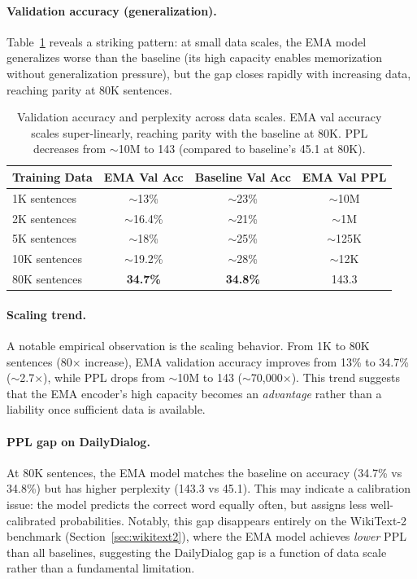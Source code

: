\documentclass[11pt]{article}
\begin{document}
\paragraph{Validation accuracy (generalization).}
Table~\ref{tab:val_acc} reveals a striking pattern: at small data scales, the EMA model generalizes worse than the baseline (its high capacity enables memorization without generalization pressure), but the gap closes rapidly with increasing data, reaching parity at 80K sentences.

\begin{table}[t]
\centering
\begin{tabular}{l c c c}
\toprule
Training Data & EMA Val Acc & Baseline Val Acc & EMA Val PPL \\
\midrule
1K sentences & $\sim$13\% & $\sim$23\% & $\sim$10M \\
2K sentences & $\sim$16.4\% & $\sim$21\% & $\sim$1M \\
5K sentences & $\sim$18\% & $\sim$25\% & $\sim$125K \\
10K sentences & $\sim$19.2\% & $\sim$28\% & $\sim$12K \\
80K sentences & \textbf{34.7\%} & \textbf{34.8\%} & 143.3 \\
\bottomrule
\end{tabular}
\caption{Validation accuracy and perplexity across data scales. EMA val accuracy scales super-linearly, reaching parity with the baseline at 80K. PPL decreases from $\sim$10M to 143 (compared to baseline's 45.1 at 80K).}
\label{tab:val_acc}
\end{table}

\paragraph{Scaling trend.}
A notable empirical observation is the scaling behavior. From 1K to 80K sentences (80$\times$ increase), EMA validation accuracy improves from 13\% to 34.7\% ($\sim$2.7$\times$), while PPL drops from $\sim$10M to 143 ($\sim$70{,}000$\times$). This trend suggests that the EMA encoder's high capacity becomes an \emph{advantage} rather than a liability once sufficient data is available.

\paragraph{PPL gap on DailyDialog.}
At 80K sentences, the EMA model matches the baseline on accuracy (34.7\% vs 34.8\%) but has higher perplexity (143.3 vs 45.1). This may indicate a calibration issue: the model predicts the correct word equally often, but assigns less well-calibrated probabilities. Notably, this gap disappears entirely on the WikiText-2 benchmark (Section~\ref{sec:wikitext2}), where the EMA model achieves \emph{lower} PPL than all baselines, suggesting the DailyDialog gap is a function of data scale rather than a fundamental limitation.
\end{document}
